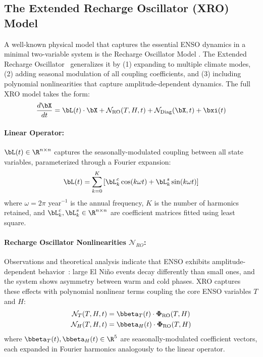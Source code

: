 \subsection{The Extended Recharge Oscillator (XRO) Model}

A well-known physical model that captures the essential ENSO dynamics in a minimal two-variable system is the Recharge Oscillator Model \cite{jin1997equatorial}. The Extended Recharge Oscillator~\cite{zhao2024xro} generalizes it by (1) expanding to multiple climate modes, (2) adding seasonal modulation of all coupling coefficients, and (3) including  polynomial nonlinearities that capture amplitude-dependent dynamics. The full XRO model takes the form:
\begin{equation}
    \frac{d\bX}{dt} = \bL(t) \cdot \bX + \mathcal{N}_{\text{RO}}(T, H, t) + \mathcal{N}_{\text{Diag}}(\bX, t) + \bxi(t)
    \label{eq:xro_full}
\end{equation}

\paragraph{Linear Operator:} $\bL(t) \in \R^{n \times n}$ captures the seasonally-modulated coupling between all state variables, parameterized through a Fourier expansion:
\begin{equation}
    \bL(t) = \sum_{k=0}^{K} \left[ \bL_k^c \cos(k\omega t) + \bL_k^s \sin(k\omega t) \right]
    \label{eq:seasonal_L}
\end{equation}
where $\omega = 2\pi$ year$^{-1}$ is the annual frequency, $K$ is the number of harmonics retained, and $\bL_k^c, \bL_k^s \in \R^{n \times n}$ are coefficient matrices fitted using least square. 

\paragraph{Recharge Oscillator Nonlinearities $\mathcal{N}_{RO}$:} Observations and theoretical analysis indicate that ENSO exhibits amplitude-dependent behavior~\cite{an2004nonlinearity}: large El Ni\~no events decay differently than small ones, and the system shows asymmetry between warm and cold phases. XRO captures these effects with polynomial nonlinear terms  coupling the core ENSO variables $T$ and $H$:
\begin{align}
    \mathcal{N}_T(T, H, t) &= \bbeta_T(t) \cdot \boldsymbol{\Phi}_{\text{RO}}(T, H) \\
    \mathcal{N}_H(T, H, t) &= \bbeta_H(t) \cdot \boldsymbol{\Phi}_{\text{RO}}(T, H)
\end{align}
where $\bbeta_T(t), \bbeta_H(t) \in \R^5$ are seasonally-modulated coefficient vectors, each expanded in Fourier harmonics analogously to the linear operator. 

